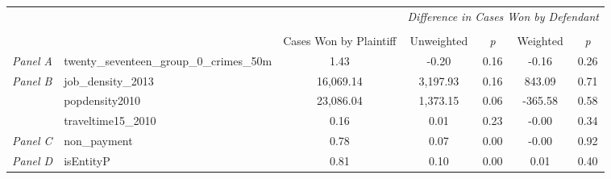 \begin{tabular}{llccccc}
\toprule
 &  & \textit{} & \multicolumn{4}{c}{\textit{Difference in Cases Won by Defendant}} \\
\cline{4-7}
\\
 &  & Cases Won by Plaintiff & Unweighted & \emph{p} & Weighted & \emph{p} \\
\midrule
\textit{Panel A} & twenty_seventeen_group_0_crimes_50m & 1.43 & -0.20 & 0.16 & -0.16 & 0.26 \\
\cline{1-7}
\multirow[c]{3}{3cm}{\textit{Panel B}} & job_density_2013 & 16,069.14 & 3,197.93 & 0.16 & 843.09 & 0.71 \\
 & popdensity2010 & 23,086.04 & 1,373.15 & 0.06 & -365.58 & 0.58 \\
 & traveltime15_2010 & 0.16 & 0.01 & 0.23 & -0.00 & 0.34 \\
\cline{1-7}
\textit{Panel C} & non_payment & 0.78 & 0.07 & 0.00 & -0.00 & 0.92 \\
\cline{1-7}
\textit{Panel D} & isEntityP & 0.81 & 0.10 & 0.00 & 0.01 & 0.40 \\
\cline{1-7}
\bottomrule
\end{tabular}
